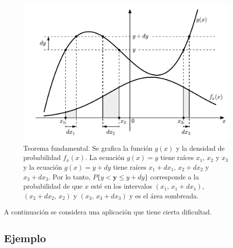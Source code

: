 \documentclass[a4paper]{report}
\newcommand{\y}{\mathbf{y}}
\begin{document}
\begin{figure}[!htb]
\begin{center}
\includegraphics[width=0.8\columnwidth]{figuras/fy_as_function_of_fx.pdf}
\caption{\label{fig:fy_as_function_of_fx} Teorema fundamental. Se grafica la función \(g(x)\) y la densidad de probabilidad \(f_x(x)\). La ecuación \(g(x)=y\) tiene raíces \(x_1\), \(x_2\) y \(x_3\) y la ecuación \(g(x)=y+dy\) tiene raíces \(x_1+dx_1\), \(x_2+dx_2\) y \(x_3+dx_3\). Por lo tanto, \(P\{y<\y\leq y+dy\}\) corresponde a la probabilidad de que \(x\) esté en los intervalos \((x_1,\,x_1+dx_1)\), \((x_2+dx_2,\,x_2)\) y \((x_3,\,x_3+dx_3)\) y es el área sombreada.}
\end{center}
\end{figure}

A continuación se considera una aplicación que tiene cierta dificultad.

\subsection{Ejemplo}
\end{document}
